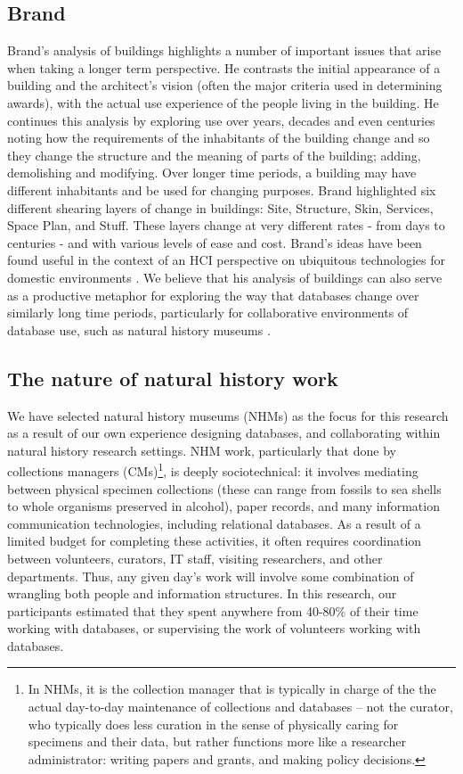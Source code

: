 \subsection{Brand}

Brand’s analysis of buildings \cite{brand1995buildings} highlights a number of important issues that arise when taking a longer term perspective. He contrasts the initial appearance of a building and the architect’s vision (often the major criteria used in determining awards), with the actual use experience of the people living in the building. He continues this analysis by exploring use over years, decades and even centuries noting how the requirements of the inhabitants of the building change and so they change the structure and the meaning of parts of the building; adding, demolishing and modifying. Over longer time periods, a building may have different inhabitants and be used for changing purposes. Brand highlighted six different shearing layers of change in buildings: Site, Structure, Skin, Services, Space Plan, and Stuff. These layers change at very different rates - from days to centuries - and with various levels of ease and cost. Brand’s ideas have been found useful in the context of an HCI perspective on ubiquitous technologies for domestic environments \cite{rodden2003evolution}. We believe that his analysis of buildings can also serve as a productive metaphor for exploring the way that databases change over similarly long time periods, particularly for collaborative environments of database use, such as natural history museums  \cite{thomer2014databases}. 

\subsection{The nature of natural history work}

We have selected natural history museums (NHMs) as the focus for this research as a result of our own experience designing databases, and collaborating within natural history research settings.  NHM work, particularly that done by collections managers (CMs)\footnote{In NHMs, it is the collection manager that is typically in charge of the the actual day-to-day maintenance of collections and databases -- not the curator, who typically does less curation in the sense of physically caring for specimens and their data, but rather functions more like a researcher administrator: writing papers and grants, and making policy decisions.}, is deeply sociotechnical: it involves mediating between physical specimen collections (these can range from fossils to sea shells to whole organisms preserved in alcohol), paper records, and many information communication technologies, including relational databases. As a result of a limited budget for completing these activities, it often requires coordination between volunteers, curators, IT staff, visiting researchers, and other departments. Thus, any given day’s work will involve some combination of wrangling both people and information structures. In this research, our participants estimated that they spent anywhere from 40-80\% of their time working with databases, or supervising the work of volunteers working with databases.

